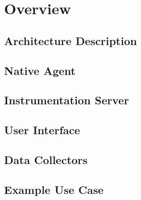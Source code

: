 \chapter{Overview}
\section{Architecture Description}
\section{Native Agent}
\section{Instrumentation Server}
\section{User Interface}
\section{Data Collectors}
\section{Example Use Case}